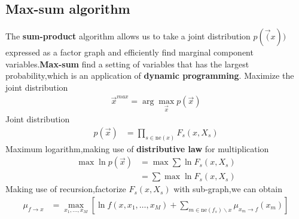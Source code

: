 \subsection{Max-sum algorithm}
The \textbf{sum-product} algorithm allows us to take a joint distribution $p(\vec(x))$ expressed as a factor graph and efficiently find marginal component variables.\textbf{Max-sum} find a setting of variables that has the largest probability,which is an application of \textbf{dynamic programming}.
Maximize the joint distribution
\begin{align}
\vec{x}^{max} = \arg\max_{\vec{x}}p(\vec{x})
\end{align}
Joint distribution
\begin{align}
p(\vec{x}) &= \prod_{s\in \text{ne}(x)}F_s(x,X_s)
\end{align}
Maximum logarithm,making use of \textbf{distributive law} for multiplication
\begin{align}
\max\ln p(\vec{x}) &=\max\sum\ln F_s(x,X_s) \\
&=\sum\max\ln F_s(x,X_s)
\end{align}
Making use of recursion,factorize $F_s(x,X_s)$ with sub-graph,we can obtain
\begin{align}
\mu_{f\rightarrow x} &= \max_{x_1,\ldots,x_M}\left[\ln f(x,x_1,\ldots,x_M) + \sum_{m\in \text{ne}(f_s)\backslash x} {\mu_{x_m\rightarrow f}(x_m)} \right]
\end{align}







